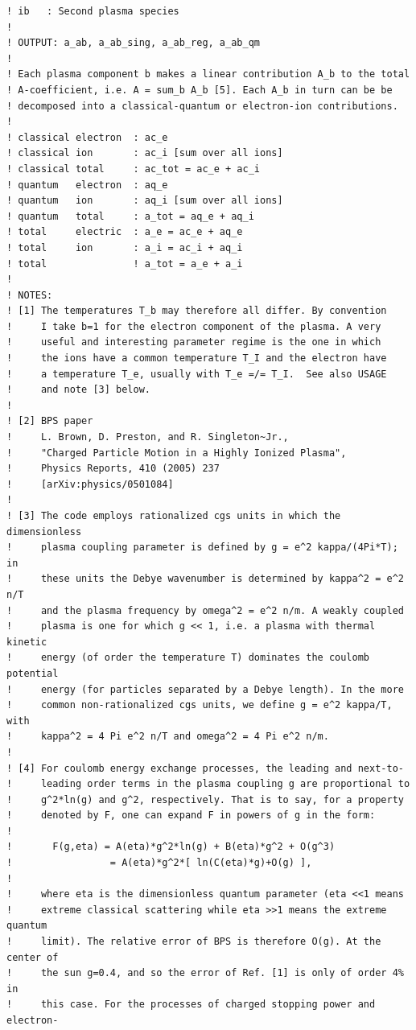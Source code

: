 \documentclass[preprint,12pt,eqsecnum,nofootinbib,amsmath,amssymb]{revtex4}
\begin{document}
{\begin{verbatim}
! ib   : Second plasma species
!
! OUTPUT: a_ab, a_ab_sing, a_ab_reg, a_ab_qm
!
! Each plasma component b makes a linear contribution A_b to the total 
! A-coefficient, i.e. A = sum_b A_b [5]. Each A_b in turn can be be 
! decomposed into a classical-quantum or electron-ion contributions.
!
! classical electron  : ac_e
! classical ion       : ac_i [sum over all ions]
! classical total     : ac_tot = ac_e + ac_i 
! quantum   electron  : aq_e
! quantum   ion       : aq_i [sum over all ions]
! quantum   total     : a_tot = aq_e + aq_i
! total     electric  : a_e = ac_e + aq_e
! total     ion       : a_i = ac_i + aq_i
! total               ! a_tot = a_e + a_i
!
! NOTES:
! [1] The temperatures T_b may therefore all differ. By convention
!     I take b=1 for the electron component of the plasma. A very
!     useful and interesting parameter regime is the one in which 
!     the ions have a common temperature T_I and the electron have
!     a temperature T_e, usually with T_e =/= T_I.  See also USAGE
!     and note [3] below.
!
! [2] BPS paper
!     L. Brown, D. Preston, and R. Singleton~Jr., 
!     "Charged Particle Motion in a Highly Ionized Plasma",
!     Physics Reports, 410 (2005) 237
!     [arXiv:physics/0501084]
!
! [3] The code employs rationalized cgs units in which the dimensionless
!     plasma coupling parameter is defined by g = e^2 kappa/(4Pi*T); in 
!     these units the Debye wavenumber is determined by kappa^2 = e^2 n/T 
!     and the plasma frequency by omega^2 = e^2 n/m. A weakly coupled 
!     plasma is one for which g << 1, i.e. a plasma with thermal kinetic 
!     energy (of order the temperature T) dominates the coulomb potential 
!     energy (for particles separated by a Debye length). In the more 
!     common non-rationalized cgs units, we define g = e^2 kappa/T, with 
!     kappa^2 = 4 Pi e^2 n/T and omega^2 = 4 Pi e^2 n/m. 
!
! [4] For coulomb energy exchange processes, the leading and next-to-
!     leading order terms in the plasma coupling g are proportional to 
!     g^2*ln(g) and g^2, respectively. That is to say, for a property 
!     denoted by F, one can expand F in powers of g in the form:
!
!       F(g,eta) = A(eta)*g^2*ln(g) + B(eta)*g^2 + O(g^3) 
!                 = A(eta)*g^2*[ ln(C(eta)*g)+O(g) ],
!
!     where eta is the dimensionless quantum parameter (eta <<1 means
!     extreme classical scattering while eta >>1 means the extreme quantum 
!     limit). The relative error of BPS is therefore O(g). At the center of 
!     the sun g=0.4, and so the error of Ref. [1] is only of order 4% in 
!     this case. For the processes of charged stopping power and electron-

\end{verbatim}}
\end{document}
